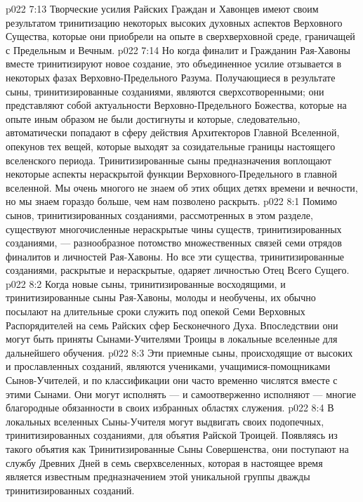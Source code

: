 \vs p022 7:13 \pc {}\bibnobreakspace {} Творческие усилия Райских Граждан и Хавонцев имеют своим результатом тринитизацию некоторых высоких духовных аспектов Верховного Существа, которые они приобрели на опыте в сверхверховной среде, граничащей с Предельным и Вечным.
\vs p022 7:14 \pc {}\bibnobreakspace {} Но когда финалит и Гражданин Рая\hyp{}Хавоны вместе тринитизируют новое создание, это объединенное усилие отзывается в некоторых фазах Верховно\hyp{}Предельного Разума. Получающиеся в результате сыны, тринитизированные созданиями, являются сверхсотворенными; они представляют собой актуальности Верховно\hyp{}Предельного Божества, которые на опыте иным образом не были достигнуты и которые, следовательно, автоматически попадают в сферу действия Архитекторов Главной Вселенной, опекунов тех вещей, которые выходят за созидательные границы настоящего вселенского периода. Тринитизированные сыны предназначения воплощают некоторые аспекты нераскрытой функции Верховного\hyp{}Предельного в главной вселенной. Мы очень многого не знаем об этих общих детях времени и вечности, но мы знаем гораздо больше, чем нам позволено раскрыть.
\vs p022 8:1 Помимо сынов, тринитизированных созданиями, рассмотренных в этом разделе, существуют многочисленные нераскрытые чины существ, тринитизированных созданиями, --- разнообразное потомство множественных связей семи отрядов финалитов и личностей Рая\hyp{}Хавоны. Но все эти существа, тринитизированные созданиями, раскрытые и нераскрытые, одаряет личностью Отец Всего Сущего.
\vs p022 8:2 \pc Когда новые сыны, тринитизированные восходящими, и тринитизированные сыны Рая\hyp{}Хавоны, молоды и необучены, их обычно посылают на длительные сроки служить под опекой Семи Верховных Распорядителей на семь Райских сфер Бесконечного Духа. Впоследствии они могут быть приняты Сынами\hyp{}Учителями Троицы в локальные вселенные для дальнейшего обучения.
\vs p022 8:3 Эти приемные сыны, происходящие от высоких и прославленных созданий, являются учениками, учащимися\hyp{}помощниками Сынов\hyp{}Учителей, и по классификации они часто временно числятся вместе с этими Сынами. Они могут исполнять --- и самоотверженно исполняют --- многие благородные обязанности в своих избранных областях служения.
\vs p022 8:4 В локальных вселенных Сыны\hyp{}Учителя могут выдвигать своих подопечных, тринитизированных созданиями, для объятия Райской Троицей. Появляясь из такого объятия как Тринитизированные Сыны Совершенства, они поступают на службу Древних Дней в семь сверхвселенных, которая в настоящее время является известным предназначением этой уникальной группы дважды тринитизированных созданий.
